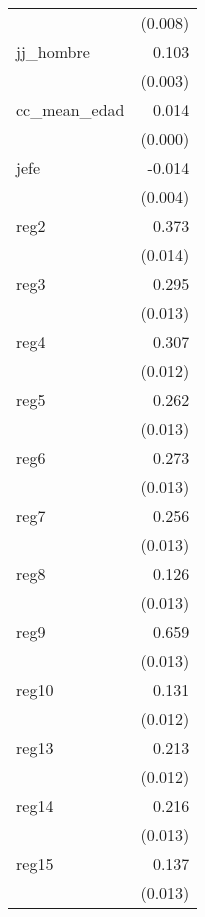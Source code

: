 {\begin{longtable}{l*{1}{D{.}{.}{-1}}}
            &     (0.008)         \\
\addlinespace
jj\_hombre   &       0.103\sym{***}\\
            &     (0.003)         \\
\addlinespace
cc\_mean\_edad&       0.014\sym{***}\\
            &     (0.000)         \\
\addlinespace
jefe        &      -0.014\sym{**} \\
            &     (0.004)         \\
\addlinespace
reg2        &       0.373\sym{***}\\
            &     (0.014)         \\
\addlinespace
reg3        &       0.295\sym{***}\\
            &     (0.013)         \\
\addlinespace
reg4        &       0.307\sym{***}\\
            &     (0.012)         \\
\addlinespace
reg5        &       0.262\sym{***}\\
            &     (0.013)         \\
\addlinespace
reg6        &       0.273\sym{***}\\
            &     (0.013)         \\
\addlinespace
reg7        &       0.256\sym{***}\\
            &     (0.013)         \\
\addlinespace
reg8        &       0.126\sym{***}\\
            &     (0.013)         \\
\addlinespace
reg9        &       0.659\sym{***}\\
            &     (0.013)         \\
\addlinespace
reg10       &       0.131\sym{***}\\
            &     (0.012)         \\
\addlinespace
reg13       &       0.213\sym{***}\\
            &     (0.012)         \\
\addlinespace
reg14       &       0.216\sym{***}\\
            &     (0.013)         \\
\addlinespace
reg15       &       0.137\sym{***}\\
            &     (0.013)         \\

\end{longtable}}

